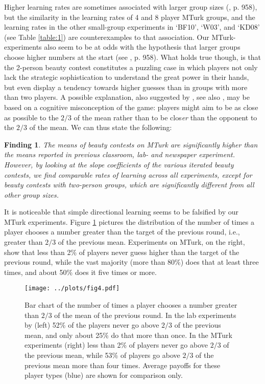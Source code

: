 \documentclass[12pt,review]{elsarticle}
\newtheorem{fdn}{Finding}
\begin{document}
Higher learning rates are sometimes associated with larger group sizes (\citet{HoCamererWeigelt98}, p. 958), but the similarity in the learning rates of 4 and 8 player MTurk groups, and the learning rates in the other small-group experiments in `BF10', `W03', and `KD08' (see Table \ref{table:1}) are counterexamples to that association. Our MTurk-experiments also seem to be at odds with the hypothesis that larger groups choose higher numbers at the start (see \citet{HoCamererWeigelt98}, p. 958). What holds true though, is that the 2-person beauty contest constitutes a puzzling case in which players not only lack the strategic sophistication to understand the great power in their hands, but even display a tendency towards higher guesses than in groups with more than two players. A possible explanation, also suggested by \citet{NagelGrosskopf2008}, see also \citet{chou2009control}, may be based on a cognitive misconception of the game: players might aim to be as close as possible to the $2/3$ of the mean rather than to be clos\emph{er} than the opponent to the $2/3$ of the mean. We can thus state the following:

\begin{fdn}
The means of beauty contests on MTurk are significantly higher than the means reported in previous classroom, lab- and newspaper experiment. However, by looking at the slope coefficients of the various iterated beauty contests, we find comparable rates of learning across all experiments, except for beauty contests with two-person groups, which are significantly different from all other group sizes.
\end{fdn}

It is noticeable that simple directional learning seems to be falsified by our MTurk experiments. Figure \ref{fig:4} pictures the distribution of the number of times a player chooses a number greater than the target of the previous round, i.e., greater than $2/3$ of the previous mean. Experiments on MTurk, on the right, show that less than 2\% of players never guess higher than the target of the previous round, while the vast majority (more than 80\%) does that at least three times, and about 50\% does it five times or more.

\begin{figure}
\texttt{[image: ../plots/fig4.pdf]}
\caption{Bar chart of the number of times a player chooses a number greater than $2/3$ of the mean of the previous round. In the lab experiments by \citet{Nagel95} (left) 52\% of the players never go above $2/3$
of the previous mean, and only about 25\% do that more than once. In the MTurk experiments (right) less than 2\% of players never go above $2/3$ of the previous mean, while 53\% of players go above $2/3$ of the previous mean more than four times. Average payoffs for these player types (blue) are shown for comparison only.}
\label{fig:4}
\end{figure}
\end{document}

